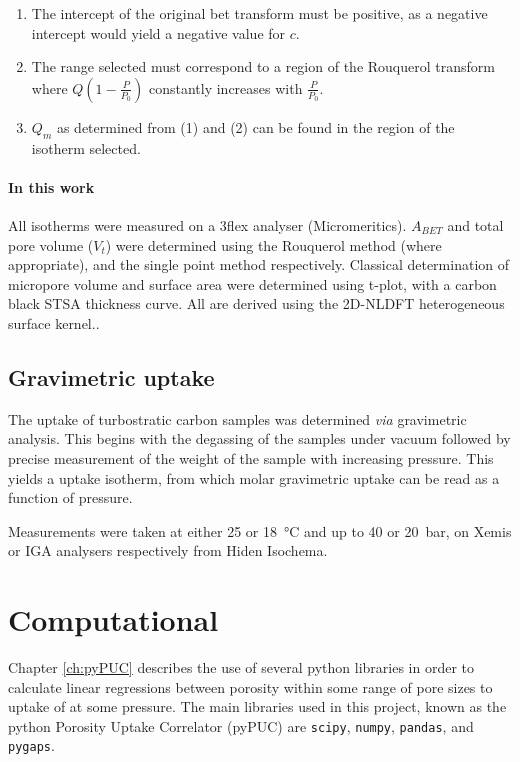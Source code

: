 	\begin{enumerate}[label=(\arabic*)]
		\item The intercept of the original \acrshort{bet} transform must be positive, as a negative intercept would yield a negative value for $c$.
		\item The range selected must correspond to a region of the Rouquerol transform where $Q \left(1 - \frac{P}{P_0} \right)$ constantly increases with $\frac{P}{P_0}$.
		\item $Q_m$ as determined from (1) and (2) can be found in the region of the isotherm selected.\citep{Rouquerol2007Is} 
	\end{enumerate}

\paragraph{In this work} All isotherms were measured on a 3flex analyser (Micromeritics). $A_{BET}$ and total pore volume ($V_t$) were determined using the Rouquerol method (where appropriate), and the single point method respectively. Classical determination of \gls{micropore} volume and surface area were determined using t-plot, with a carbon black STSA thickness curve. All  are derived using the 2D-NLDFT heterogeneous surface kernel.\citep{Jagiello20132D}.

\subsection{\texorpdfstring{Gravimetric  uptake}{Gravimetric CO2 uptake}}
The  uptake of \gls{turbostratic carbon} samples was determined \textit{via} gravimetric analysis. This begins with the degassing of the samples under vacuum followed by precise measurement of the weight of the sample with increasing  pressure. This yields a  uptake isotherm, from which molar gravimetric uptake can be read as a function of pressure.

Measurements were taken at either \num{25} or \qty{18}{\degreeCelsius} and up to \num{40} or \qty{20}{\bar}, on Xemis or IGA analysers respectively from Hiden Isochema. 

\section{Computational}
Chapter \ref{ch:pyPUC} describes the use of several python libraries in order to calculate linear regressions between porosity within some range of pore sizes to uptake of  at some pressure. The main libraries used in this project, known as the python Porosity Uptake Correlator (pyPUC) are \verb|scipy|,\citep{SciPy2020} \verb|numpy|,\citep{numpy2022} \verb|pandas|,\citep{pandas2010} and \verb|pygaps|.\citep{Iacomi2019pyGAPS}


